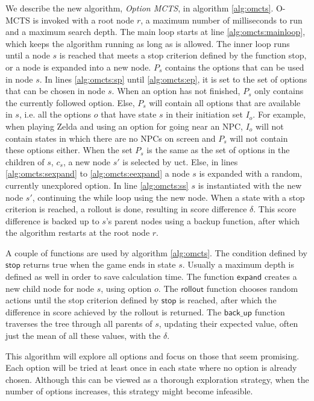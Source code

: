 We describe the new algorithm, \emph{Option MCTS}, in algorithm
\ref{alg:omcts}. O-MCTS is invoked with a root node $r$, a maximum
number of milliseconds to run and a maximum search depth. The main loop starts at line
\ref{alg:omcts:mainloop}, which keeps the algorithm running as long as is
allowed. The inner loop runs until a node $s$ is reached that meets a stop
criterion defined by the function \textsf{stop}, or a node is expanded into a new
node. $P_s$ contains the options that can be used in node $s$. In lines
\ref{alg:omcts:sp} until \ref{alg:omcts:ep}, it is set
to the set of options that can be chosen in node $s$. When an option has not
finished, $P_s$ only contains the currently followed option. Else, $P_s$ will
contain all options that are available in $s$, i.e. all the options $o$ that
have state $s$ in their initiation set $I_o$. For example, when playing 
Zelda and using an option for going near an NPC, $I_o$ will not contain states
in which there are no NPCs on screen and $P_s$ will not contain these options
either. When the set $P_s$ is the same as
the set of options in the children of $s$, $c_s$, a new node $s'$ is selected by
\textsf{uct}. Else, in lines \ref{alg:omcts:sexpand} to \ref{alg:omcts:eexpand}
a node $s$ is expanded with a random, currently unexplored option. In line
\ref{alg:omcts:ss} $s$ is instantiated with the new node $s'$, continuing the
while loop using the new node. When a state with a stop criterion is reached, a
rollout is done, resulting in score difference $\delta$. This score difference
is backed up to $s$'s parent nodes using a backup function, after which the
algorithm restarts at the root node $r$.

A couple of functions are used by algorithm \ref{alg:omcts}. The condition defined by
$\mathsf{stop}$ returns true when the game ends in state $s$. Usually
a maximum depth is defined as well in order to save calculation time. The
function $\mathsf{expand}$ creates a new child node for node $s$, using option
$o$. The $\mathsf{rollout}$ function chooses random actions until the stop
criterion defined by $\mathsf{stop}$ is reached, after which the difference in
score achieved by the rollout is returned. The $\mathsf{back\_up}$ function
traverses the tree through all parents of $s$, updating their expected value,
 often just the mean of all these values,  with the $\delta$. 

This algorithm will explore all options and focus on those that seem promising.
Each option will be tried at least once in each state where no option is already
chosen. Although this can be viewed as a thorough exploration strategy, when the
number of options increases, this strategy might become infeasible.


